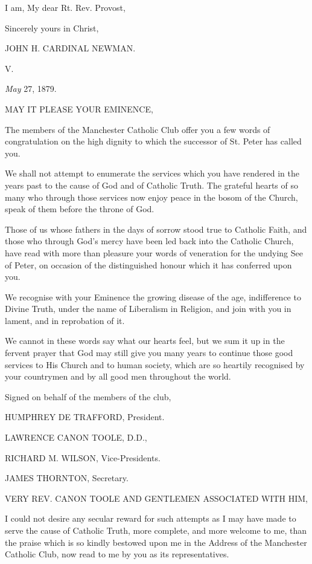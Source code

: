 I am, My dear Rt. Rev. Provost,

Sincerely yours in Christ,

JOHN H. CARDINAL NEWMAN.

V.


\emph{May} 27, 1879.

MAY IT PLEASE
YOUR EMINENCE,

The members of the Manchester Catholic Club offer you a few words of
congratulation on the high dignity to which the successor of St. Peter
has called you.

We shall not attempt to enumerate the services which you have
rendered in the years past to the cause of God and of Catholic Truth.
The grateful hearts of so many who through those services now enjoy
peace in the bosom of the Church, speak of them before the throne of
God.

Those of us whose fathers in the days of sorrow stood true to
Catholic Faith, and those who through God's mercy have been led back
into the Catholic Church, have read with more than pleasure your words
of veneration for the undying See of Peter, on occasion of the
distinguished honour which it has conferred upon you.

We recognise with your Eminence the growing disease of the age,
indifference to Divine Truth, under the name of Liberalism in
Religion, and join with you in lament, and in reprobation of it.

We cannot in these words say what our hearts feel, but we sum it up
in the fervent prayer that God may still give you many years to
continue those good services to His Church and to human society,
which are so heartily recognised by your countrymen and by all good
men throughout the world.

Signed on behalf of the members of the club,

HUMPHREY DE TRAFFORD,
President.

LAWRENCE CANON TOOLE,
D.D.,

RICHARD M. WILSON,
Vice-Presidents.

JAMES THORNTON, Secretary.


VERY REV. CANON
TOOLE AND GENTLEMEN
ASSOCIATED WITH HIM,

I could not desire any secular reward for such attempts as I may have
made to serve the cause of Catholic Truth, more complete, and more
welcome to me, than the praise which is so kindly bestowed upon me in
the Address of the Manchester Catholic Club, now read to me by you as
its representatives.

